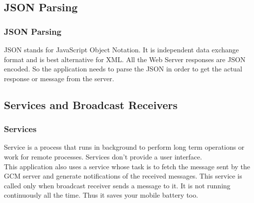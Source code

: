 \documentclass{beamer}   %
\begin{document}
\subsection{JSON Parsing}
\begin{frame}
\frametitle{JSON Parsing}
JSON stands for JavaScript Object Notation. It is independent data exchange format and is best alternative for XML.
All the Web Server responses are JSON encoded. So the application needs to parse the JSON in order to get the actual response or message from the server. 

\end{frame}

\subsection{Services and Broadcast Receivers}
\begin{frame}
\frametitle{Services}
Service is a process that runs in background to perform long term operations or work for remote processes. Services don't provide a user interface.\\
This application also uses a service whose task is to fetch the message sent by the GCM server and generate notifications of the received messages. This service is called only when broadcast receiver sends a message to it. It is not running continuously all the time. Thus it saves your mobile battery too.
 
\end{frame}
\end{document}
